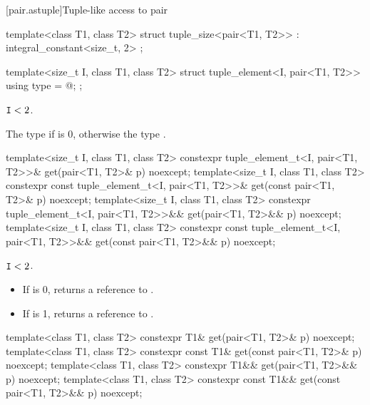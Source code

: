 [pair.astuple]{Tuple-like access to pair}

%
\begin{itemdecl}
template<class T1, class T2>
  struct tuple_size<pair<T1, T2>> : integral_constant<size_t, 2> { };
\end{itemdecl}

%
\begin{itemdecl}
template<size_t I, class T1, class T2>
  struct tuple_element<I, pair<T1, T2>> {
    using type = @\seebelow@ ;
  };
\end{itemdecl}
\begin{itemdescr}
\pnum
\mandates
$\tcode{I} < 2$.

\pnum
\result
The type  if  is 0, otherwise the type .
\end{itemdescr}

%
\begin{itemdecl}
template<size_t I, class T1, class T2>
  constexpr tuple_element_t<I, pair<T1, T2>>& get(pair<T1, T2>& p) noexcept;
template<size_t I, class T1, class T2>
  constexpr const tuple_element_t<I, pair<T1, T2>>& get(const pair<T1, T2>& p) noexcept;
template<size_t I, class T1, class T2>
  constexpr tuple_element_t<I, pair<T1, T2>>&& get(pair<T1, T2>&& p) noexcept;
template<size_t I, class T1, class T2>
  constexpr const tuple_element_t<I, pair<T1, T2>>&& get(const pair<T1, T2>&& p) noexcept;
\end{itemdecl}

\begin{itemdescr}
\pnum
\mandates
$\tcode{I} < 2$.

\pnum
\returns
\begin{itemize}
\item If  is 0, returns a reference to .
\item If  is 1, returns a reference to .
\end{itemize}
\end{itemdescr}

%
\begin{itemdecl}
template<class T1, class T2>
  constexpr T1& get(pair<T1, T2>& p) noexcept;
template<class T1, class T2>
  constexpr const T1& get(const pair<T1, T2>& p) noexcept;
template<class T1, class T2>
  constexpr T1&& get(pair<T1, T2>&& p) noexcept;
template<class T1, class T2>
  constexpr const T1&& get(const pair<T1, T2>&& p) noexcept;
\end{itemdecl}

